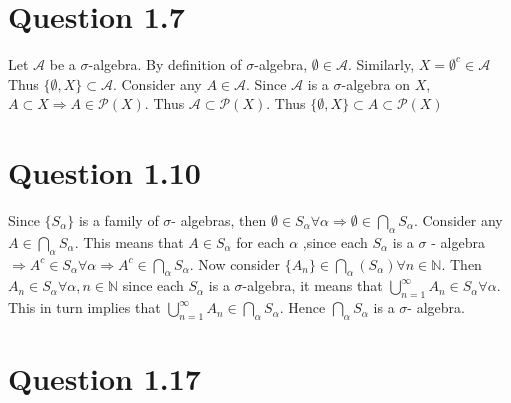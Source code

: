 \documentclass{article}
\begin{document}
  \section*{Question 1.7}
    Let $\mathcal{A}$ be a $\sigma$-algebra. By definition of $\sigma$-algebra, $\emptyset \in \mathcal{A}$. Similarly, $X = {\emptyset}^c \in \mathcal{A}$
    Thus $\{\emptyset, X\} \subset \mathcal{A}$. Consider any $A \in \mathcal{A}$. Since $\mathcal{A}$ is a $\sigma$-algebra on $X$, $A \subset X \Rightarrow
    A \in \mathcal{P}(X)$. Thus $\mathcal{A} \subset \mathcal{P}(X)$. Thus $\{\emptyset, X\} \subset A \subset \mathcal{P}(X)$
    \newpage
  \section*{Question 1.10}
  \begin{flushleft}
    Since $\{S_\alpha\}$ is a family of $\sigma$- algebras, then $\emptyset \in S_\alpha \forall \alpha \Rightarrow \emptyset \in
    \bigcap_{\alpha}S_\alpha$. 
    \linebreak
    \linebreak
    Consider any $A \in  \bigcap_{\alpha}S_\alpha$. This means that $A \in S_\alpha$ for each $\alpha$
    ,since each $S_\alpha$ is a $\sigma$ - algebra $\Rightarrow A^c \in S_\alpha \forall \alpha \Rightarrow A^c \in \bigcap_{\alpha}S_\alpha$.
    \linebreak
    \linebreak
    Now consider $\{A_n\} \in \bigcap_{\alpha}(S_\alpha) \forall n \in \mathbb{N}$. Then $A_n \in S_\alpha \forall \alpha, n \in \mathbb{N}$
    since each $S_\alpha$ is a $\sigma$-algebra, it means that $\bigcup_{n=1}^{\infty}A_n \in S_\alpha \forall \alpha$. 
    \linebreak
    \linebreak
    This in turn implies that
    $\bigcup_{n=1}^{\infty}A_n \in \bigcap_{\alpha}S_\alpha$. Hence $\bigcap_{\alpha}S_\alpha$ is a $\sigma$- algebra.
  \end{flushleft}
  
  \section*{Question 1.17}
  
\end{document}
